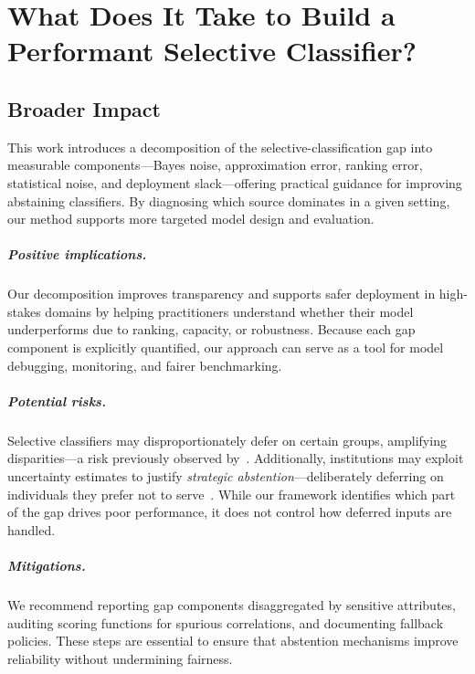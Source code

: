 \chapter{What Does It Take to Build a Performant Selective Classifier?}

\section{Broader Impact}
\label{sec:broader_impact}

This work introduces a decomposition of the selective-classification gap into measurable components—Bayes noise, approximation error, ranking error, statistical noise, and deployment slack—offering practical guidance for improving abstaining classifiers. By diagnosing which source dominates in a given setting, our method supports more targeted model design and evaluation.

\paragraph{Positive implications.}
Our decomposition improves transparency and supports safer deployment in high-stakes domains by helping practitioners understand whether their model underperforms due to ranking, capacity, or robustness. Because each gap component is explicitly quantified, our approach can serve as a tool for model debugging, monitoring, and fairer benchmarking.

\paragraph{Potential risks.}
Selective classifiers may disproportionately defer on certain groups, amplifying disparities—a risk previously observed by~\citet{jones2020selective}. Additionally, institutions may exploit uncertainty estimates to justify \emph{strategic abstention}—deliberately deferring on individuals they prefer not to serve~\citep{rabanser2025confidential}. While our framework identifies which part of the gap drives poor performance, it does not control how deferred inputs are handled.

\paragraph{Mitigations.}
We recommend reporting gap components disaggregated by sensitive attributes, auditing scoring functions for spurious correlations, and documenting fallback policies. These steps are essential to ensure that abstention mechanisms improve reliability without undermining fairness.

